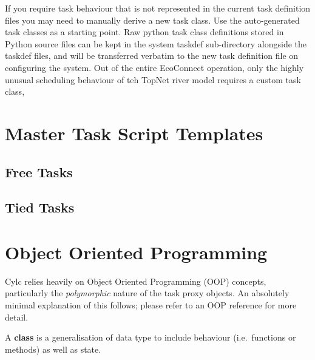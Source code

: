 \documentclass[11pt,a4paper]{article}
\begin{document}
If you require task behaviour that is not represented in the current 
task definition files you may need to manually derive a new task class.
Use the auto-generated task classes as a starting point. Raw python 
task class definitions stored in Python source files can be 
kept in the system taskdef sub-directory alongside the taskdef files,
and will be transferred verbatim to the new task definition file on 
configuring the system.  Out of the entire EcoConnect operation, only 
the highly unusual scheduling behaviour of teh TopNet river model 
requires a custom task class,


\pagebreak
\section{Master Task Script Templates}
\label{MasterTaskScriptTemplates}



\lstset{language=bash}

\pagebreak
\subsection{Free Tasks}


\pagebreak
\subsection{Tied Tasks}


\appendix

\pagebreak
\section{Object Oriented Programming}
\label{ObjectOrientedProgramming}

Cylc relies heavily on Object Oriented Programming (OOP) concepts,
particularly the {\em polymorphic} nature of the task proxy objects.
An absolutely minimal explanation of this follows; 
please refer to an OOP reference for more detail.

A {\bf class} is a generalisation of data type to include behaviour
(i.e.\ functions or methods) as well as state. 

\end{document}
